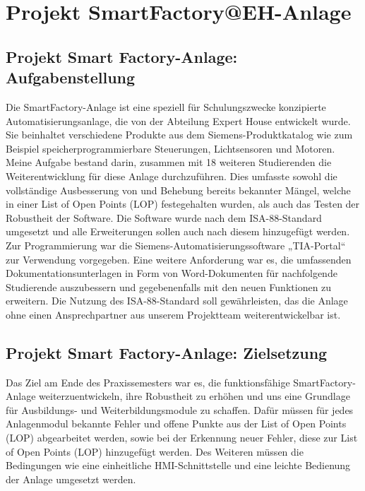\chapter{Projekt SmartFactory@EH-Anlage}\label{ch:data}

\section{Projekt Smart Factory-Anlage: Aufgabenstellung}\label{sec:Projekt Smart Factory-Anlage: Aufgabenstellung}

Die SmartFactory-Anlage ist eine speziell für Schulungszwecke konzipierte
Automatisierungsanlage, die von der Abteilung Expert House entwickelt wurde. Sie beinhaltet verschiedene Produkte aus dem Siemens-Produktkatalog 
wie zum Beispiel speicherprogrammierbare Steuerungen, Lichtsensoren und Motoren.
Meine Aufgabe bestand darin, zusammen mit 18 weiteren Studierenden die
Weiterentwicklung für diese Anlage durchzuführen. Dies umfasste sowohl die
vollständige Ausbesserung von und Behebung bereits bekannter Mängel, welche in einer List of Open Points (LOP) festegehalten wurden, 
als auch das Testen der Robustheit der Software. Die Software wurde nach dem 
ISA-88-Standard umgesetzt und alle Erweiterungen sollen auch nach diesem hinzugefügt werden. Zur Programmierung war 
die Siemens-Automatisierungssoftware „TIA-Portal“ zur Verwendung vorgegeben. Eine weitere Anforderung war es, die 
umfassenden Dokumentationsunterlagen in Form von Word-Dokumenten für nachfolgende Studierende auszubessern und 
gegebenenfalls mit den neuen Funktionen zu erweitern. Die Nutzung des ISA-88-Standard soll gewährleisten, das die Anlage 
ohne einen Ansprechpartner aus unserem Projektteam weiterentwickelbar ist. 


\section{Projekt Smart Factory-Anlage: Zielsetzung}\label{sec:Projekt Smart Factory-Anlage: Zielsetzung}

Das Ziel am Ende des Praxissemesters war es, die funktionsfähige
SmartFactory-Anlage weiterzuentwickeln, ihre Robustheit zu erhöhen und uns eine Grundlage für Ausbildungs- und Weiterbildungsmodule zu schaffen. 
Dafür müssen für jedes Anlagenmodul bekannte Fehler und offene Punkte aus der List of Open Points (LOP) abgearbeitet werden, sowie bei der Erkennung neuer Fehler, 
diese zur List of Open Points (LOP) hinzugefügt werden. Des Weiteren müssen die Bedingungen wie eine einheitliche HMI-Schnittstelle 
und eine leichte Bedienung der Anlage umgesetzt werden.

